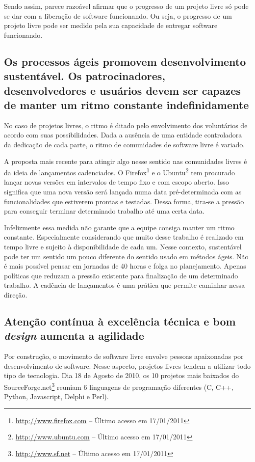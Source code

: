 Sendo assim, parece razoável afirmar que o progresso de um projeto
livre só pode se dar com a liberação de software funcionando. Ou seja,
o progresso de um projeto livre pode ser medido pela sua capacidade de
entregar software funcionando.

\subsection[Ritmo sustentável]{Os processos ágeis promovem
  desenvolvimento sustentável. Os patrocinadores, desenvolvedores e
  usuários devem ser capazes de manter um ritmo constante
  indefinidamente}

No caso de projetos livres, o ritmo é ditado pelo envolvimento dos
voluntários de acordo com suas possibilidades. Dada a ausência de uma
entidade controladora da dedicação de cada parte, o ritmo de
comunidades de software livre é variado.

A proposta mais recente para atingir algo nesse sentido nas
comunidades livres é da ideia de lançamentos cadenciados. O
Firefox\footnote{\url{http://www.firefox.com} -- Último acesso em
    17/01/2011} e o Ubuntu\footnote{\url{http://www.ubuntu.com} --
    Último acesso em 17/01/2011} tem procurado lançar novas versões
em intervalos de tempo fixo e com escopo aberto. Isso significa que
uma nova versão será lançada numa data pré-determinada com as
funcionalidades que estiverem prontas e testadas.  Dessa forma,
tira-se a pressão para conseguir terminar determinado trabalho até uma
certa data.

Infelizmente essa medida não garante que a equipe consiga manter um
ritmo constante. Especialmente considerando que muito desse trabalho é
realizado em tempo livre e sujeito à disponibilidade de cada um. Nesse
contexto, sustentável pode ter um sentido um pouco diferente do
sentido usado em métodos ágeis. Não é mais possível pensar em jornadas
de 40 horas e folga no planejamento. Apenas políticas que reduzam a
pressão existente para finalização de um determinado trabalho. A
cadência de lançamentos é uma prática que permite caminhar nessa
direção.

\subsection[Excelência técnica]{Atenção contínua à excelência técnica
  e bom \textit{design} aumenta a agilidade}

Por construção, o movimento de software livre envolve pessoas
apaixonadas por desenvolvimento de software. Nesse aspecto, projetos
livres tendem a utilizar todo tipo de tecnologia.  Dia 18 de Agosto de
2010, os 10 projetos mais baixados do
SourceForge.net\footnote{\url{http://www.sf.net} -- Último acesso em
    17/01/2011} reuniam 6 linguagens de programação diferentes (C,
C++, Python, Javascript, Delphi e Perl).


